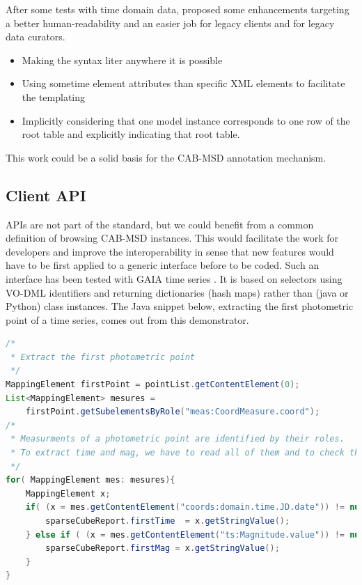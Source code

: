 \documentclass[11pt,a4paper]{ivoa}
\begin{document}
After some tests with time domain data, \cite{talk:lmlite} \cite{talk:lmgaia} proposed some enhancements targeting a better human-readability and an easier job for legacy clients and for legacy data curators.

\begin{itemize}
\item Making the syntax liter anywhere it is possible
\item Using sometime element attributes than specific XML elements to facilitate the templating
\item Implicitly considering that one model instance corresponds to one row of the root table and explicitly indicating that root table.
\end{itemize}

This work could be a solid basis for the CAB-MSD annotation mechanism.

\subsection{Client API}
APIs are not part of the standard, but we could benefit from a common definition of browsing CAB-MSD instances.  This would facilitate the work for developers and improve the interoperability in sense that new features would have to be first applied to a generic interface before to be coded.
Such an interface has been tested with GAIA time series \citep{talk:lmparser}. It is based on selectors using VO-DML identifiers and returning dictionaries (hash maps) rather than (java or Python) class instances. 
The Java snippet below, extracting the first photometric point of a time series, comes out from this demonstrator. 

\begin{lstlisting}[language=java]
/*
 * Extract the first photometric point
 */
MappingElement firstPoint = pointList.getContentElement(0);		
List<MappingElement> mesures =
    firstPoint.getSubelementsByRole("meas:CoordMeasure.coord");
/*
 * Measurments of a photometric point are identified by their roles. 
 * To extract time and mag, we have to read all of them and to check the roles
 */
for( MappingElement mes: mesures){
	MappingElement x;
	if( (x = mes.getContentElement("coords:domain.time.JD.date")) != null ) {
		sparseCubeReport.firstTime  = x.getStringValue();
	} else if ( (x = mes.getContentElement("ts:Magnitude.value")) != null ) {
	    sparseCubeReport.firstMag = x.getStringValue();
	} 
}
\end{lstlisting}
\end{document}
